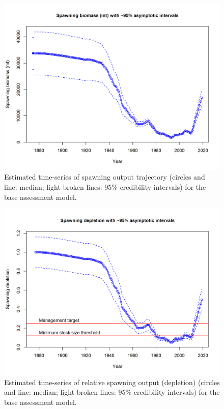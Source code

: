 \documentclass[12pt,]{article}
\begin{document}
\begin{figure}[htbp]
\centering
\includegraphics{r4ss/plots_mod1/ts7_Spawning_biomass_(mt)_with_95_asymptotic_intervals_intervals.png}
\caption{Estimated time-series of spawning output trajectory (circles
and line: median; light broken lines: 95\% credibility intervals) for
the base assessment model. \label{fig:Spawnbio_all}}
\end{figure}

\begin{figure}[htbp]
\centering
\includegraphics{r4ss/plots_mod1/ts9_Spawning_depletion_with_95_asymptotic_intervals_intervals.png}
\caption{Estimated time-series of relative spawning output (depletion)
(circles and line: median; light broken lines: 95\% credibility
intervals) for the base assessment model. \label{fig:RelDeplete_all}}
\end{figure}
\end{document}
